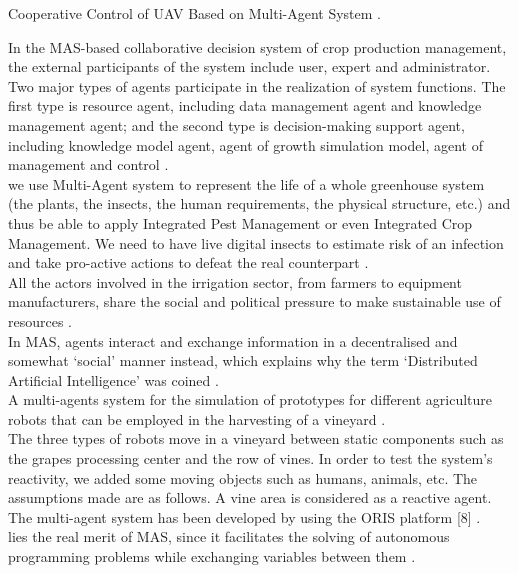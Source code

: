 \documentclass[letterpaper, 10 pt, conference]{ieeeconf}  %
\begin{document}
Cooperative Control of UAV Based on Multi-Agent System \cite{han2013}.

In the MAS-based collaborative decision system of crop production management, the external participants of the system include user, expert and administrator. Two major types of agents participate in the realization of system functions. The first type is resource agent, including data management agent and knowledge management agent; and the second type is decision-making support agent, including knowledge model agent, agent of growth simulation model, agent of management and control \cite{Ye-ping2011}. \\

we use Multi-Agent system to represent the life of a whole greenhouse system (the plants, the insects, the human requirements, the physical structure, etc.) and thus be able to apply Integrated Pest Management or even Integrated Crop Management. We need to have live digital insects to estimate risk of an infection and take pro-active actions to defeat the real counterpart  \cite{Li}.\\

All the actors involved in the irrigation sector, from farmers to equipment manufacturers, share the social and political pressure to make sustainable use of resources \cite{Li}.\\

In MAS, agents interact and exchange information in a decentralised and somewhat ‘social’ manner instead, which explains why the term ‘Distributed Artiﬁcial Intelligence’ was coined \cite{Berger2001}.\\

A multi-agents system for the simulation of prototypes for different agriculture robots that can be employed in the harvesting of a vineyard  \cite{Arguenon2006}. \\

The three types of robots move in a vineyard between static components such as the grapes processing center and the row of vines. In order to test the system’s reactivity, we added some moving objects such as humans, animals, etc. The assumptions made are as follows. A vine area is considered as a reactive agent. The multi-agent system has been developed by using the ORIS platform [8]  \cite{Arguenon2006}. \\

lies the real merit of MAS, since it facilitates the solving of autonomous programming problems while exchanging variables between them \cite{Berger2001}.\\
\end{document}
